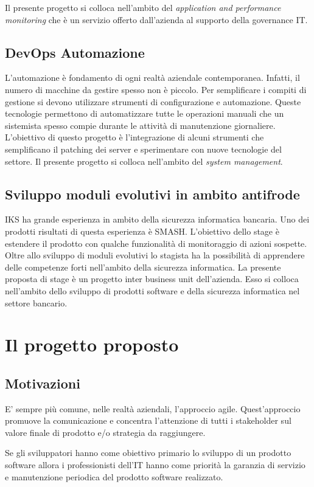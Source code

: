 Il presente progetto si colloca nell'ambito del \textit{application and performance monitoring} che è un servizio offerto dall'azienda al supporto della governance IT. 


\subsection{DevOps Automazione}
L'automazione è fondamento di ogni realtà aziendale contemporanea. Infatti, il numero di macchine da gestire spesso non è piccolo. Per semplificare i compiti di gestione si devono utilizzare strumenti di configurazione e automazione. Queste tecnologie permettono di automatizzare tutte le operazioni 
manuali che un sistemista spesso compie durante le attività di manutenzione giornaliere. L'obiettivo di questo progetto è l'integrazione di alcuni strumenti che semplificano il \gls{patching} dei server e sperimentare con nuove tecnologie del settore.
Il presente progetto si colloca nell'ambito del \textit{system management}. 

\subsection{Sviluppo moduli evolutivi in ambito antifrode}
IKS ha grande esperienza in ambito della sicurezza informatica bancaria. Uno dei prodotti risultati di questa esperienza è SMASH. L'obiettivo dello stage è estendere il prodotto con qualche funzionalità di monitoraggio di azioni sospette. Oltre allo sviluppo di moduli evolutivi lo stagista ha la possibilità di apprendere delle competenze forti nell'ambito della 
sicurezza informatica. 
La presente proposta di stage è un progetto inter business unit dell'azienda. 
Esso si colloca nell'ambito dello sviluppo di prodotti software e della sicurezza informatica nel settore bancario.


\section{Il progetto proposto}
\subsection{Motivazioni}

E' sempre più comune, nelle realtà aziendali, l'approccio agile. Quest'approccio 
promuove la comunicazione e concentra l'attenzione di tutti i stakeholder sul valore 
finale di prodotto e/o strategia da raggiungere. 

Se gli sviluppatori hanno come obiettivo primario lo sviluppo di un prodotto software 
allora i professionisti dell'IT hanno come priorità la garanzia di servizio e manutenzione 
periodica del prodotto software realizzato. 

